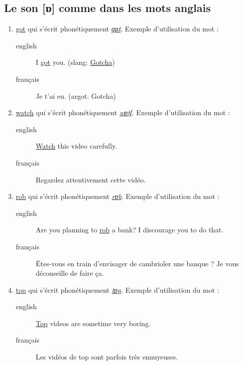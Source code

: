 \documentclass[12pt,a4paper]{book}
\begin{document}
\subsection{Le son [ɒ] comme dans les mots anglais}
\label{sec:orgb3f3634}
\begin{enumerate}
\item \href{http://www.wordreference.com/enfr/got}{got} qui s'écrit phonétiquement \href{https://en.oxforddictionaries.com/definition/got}{\emph{ɡɒt}}. Exemple d'utilisation du mot :
\begin{description}
\item[{english}] \textenglish{I \href{https://youtu.be/Bo09BiPb24Y}{got} you. (slang: \href{https://youtu.be/EWRaAbVUkjA}{Gotcha})}
\item[{français}] Je t'ai eu. (argot: Gotcha)
\end{description}
\item \href{http://www.wordreference.com/enfr/watch}{watch} qui s'écrit phonétiquement \href{https://en.oxforddictionaries.com/definition/watch}{\emph{wɒtʃ}}. Exemple d'utilisation du mot :
\begin{description}
\item[{english}] \textenglish{\href{https://youtu.be/qOs8MagOfwg}{Watch} this video carefully.}
\item[{français}] Regardez attentivement cette vidéo.
\end{description}
\item \href{http://www.wordreference.com/enfr/rob}{rob} qui s'écrit phonétiquement \href{https://en.oxforddictionaries.com/definition/rob}{\emph{rɒb}}. Exemple d'utilisation du mot :
\begin{description}
\item[{english}] \textenglish{Are you planning to \href{https://youtu.be/X3uZ0Gf104A}{rob} a bank? I discourage you to do
that.}
\item[{français}] Êtes-vous en train d'envisager de cambrioler une
banque ? Je vous déconseille de faire ça.
\end{description}
\item \href{http://www.wordreference.com/enfr/top}{top} qui s'écrit phonétiquement \href{https://en.oxforddictionaries.com/definition/top}{\emph{tɒp}}. Exemple d'utilisation du mot : 
\begin{description}
\item[{english}] \textenglish{\href{https://youtu.be/gPaD513xWOY}{Top} videos are sometime very boring.}
\item[{français}] Les vidéos de top sont parfois très ennuyeuses.
\end{description}
\end{enumerate}
\end{document}
